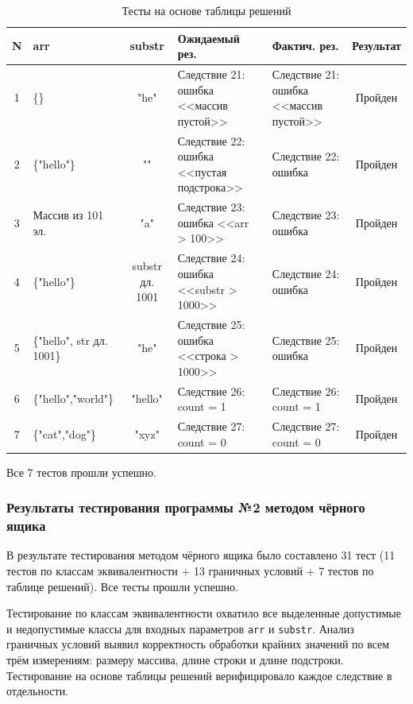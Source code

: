 \documentclass{article}[14pt]
\begin{document}
\begin{table}[H]
\centering
\caption{Тесты на основе таблицы решений}
\renewcommand{\arraystretch}{1.5}
\begin{tabularx}{\textwidth}{|c|X|c|X|X|c|}
\hline
\textbf{N} & \textbf{arr} & \textbf{substr} & \textbf{Ожидаемый рез.} & \textbf{Фактич. рез.} & \textbf{Результат} \\
\hline
1 & \{\} & "he" & Следствие 21: ошибка <<массив пустой>> & Следствие 21: ошибка <<массив пустой>> & Пройден \\
\hline
2 & \{"hello"\} & "" & Следствие 22: ошибка <<пустая подстрока>> & Следствие 22: ошибка & Пройден \\
\hline
3 & Массив из 101 эл. & "a" & Следствие 23: ошибка <<arr > 100>> & Следствие 23: ошибка & Пройден \\
\hline
4 & \{"hello"\} & substr дл. 1001 & Следствие 24: ошибка <<substr > 1000>> & Следствие 24: ошибка & Пройден \\
\hline
5 & \{"hello", str дл. 1001\} & "he" & Следствие 25: ошибка <<строка > 1000>> & Следствие 25: ошибка & Пройден \\
\hline
6 & \{"hello","world"\} & "hello" & Следствие 26: count = 1 & Следствие 26: count = 1 & Пройден \\
\hline
7 & \{"cat","dog"\} & "xyz" & Следствие 27: count = 0 & Следствие 27: count = 0 & Пройден \\
\hline
\end{tabularx}
\end{table}

Все 7 тестов прошли успешно.

\subsubsection{Результаты тестирования программы №2 методом чёрного ящика}

В результате тестирования методом чёрного ящика было составлено 31 тест
(11 тестов по классам эквивалентности + 13 граничных условий + 7 тестов по таблице решений).
Все тесты прошли успешно.

Тестирование по классам эквивалентности охватило все выделенные допустимые и недопустимые классы
для входных параметров \texttt{arr} и \texttt{substr}. Анализ граничных условий выявил корректность
обработки крайних значений по всем трём измерениям: размеру массива, длине строки и длине подстроки.
Тестирование на основе таблицы решений верифицировало каждое следствие в отдельности.
\end{document}
